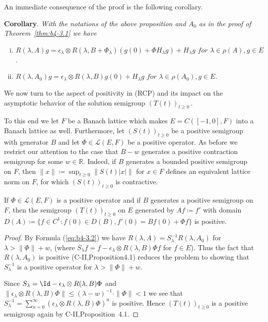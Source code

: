 An immediate consequence of the proof is the following corollary.

\medskip\noindent{}
\textbf{Corollary}. \textit{ With the notations of the above proposition and $A_{0}$ as in the proof of Theorem~\ref{thm:b4-3.1} we have}
\begin{enumerate}[(i),wide]
	\item  
	$R(\lambda,A)g = \epsilon_\lambda \otimes R(\lambda,B+\Phi_\lambda)(g(0)+\Phi H_\lambda g) + H_\lambda g \textit{ for } \lambda \in \rho(A), g \in E$.

	\item 
	$R(\lambda,A_{0})g = \epsilon_\lambda \otimes R(\lambda,B)g(0) + H_\lambda g \textit{ for }  \lambda \in \rho(A_{0}), g \in E$.
\end{enumerate}

We now turn to the aspect of positivity in (RCP) and its impact on the asymptotic behavior of the solution semigroup $(T(t))_{t \geq 0}$\,.

To this end we let $F$ be a Banach lattice which makes $E = C([-1,0],F)$ into a Banach lattice as well. Furthermore, let $(S(t))_{t \geq 0}$ be a positive semigroup with generator $B$ and let $\Phi \in \mathcal{L}(E,F)$ be a positive operator. As before we restrict our attention to the case that $B - w$ generates a positive contraction semigroup for some $w \in \mathbb{R}$. Indeed, if $B$ generates a bounded positive semigroup on $F$, then $\|x\|  \coloneq  \sup_{t \geq 0}\|S(t)|x|\|$ for $x \in F$ defines an equivalent lattice norm on $F$, for which $(S(t))_{t \geq 0}$ is contractive.
\begin{proposition}\label{prop:b4-3.5}
	If $\Phi \in \mathcal{L}(E,F)$ is a positive operator and if $B$ generates a positive semigroup on $F$, then the semigroup $(T(t))_{t \geq 0}$ on $E$ generated by $Af  \coloneq  f'$ with domain $D(A)  \coloneq  \{f \in C^1 \colon f(0) \in D(B), f'(0) = Bf(0) + \Phi f\}$ is positive.
\end{proposition}
%
%
\newpage
%
\begin{proof} By Formula (\ref{eq:b4-3.2}) we have $R(\lambda,A) = S_\lambda^{-1}R(\lambda,A_{0})$ for $\lambda > \|\Phi\|+w$, (where $S_\lambda f = f - \epsilon_\lambda \otimes R(\lambda,B)\Phi f$ for $f \in E$). Thus the fact that $R(\lambda,A_{0})$ is positive (C-II,Proposition4.1) reduces the problem to showing that $S_\lambda^{-1}$ is a positive operator for $\lambda > \|\Phi\|+w$.

Since $S_\lambda = \Id  - \epsilon_\lambda \otimes R(\lambda,B)\Phi$ and $\|\epsilon_\lambda \otimes R(\lambda,B)\Phi\| \leq (\lambda-w)^{-1} \cdot \|\Phi\| < 1$ we see that $S_\lambda^{-1} = \sum_{n=0}^{\infty}(\epsilon_\lambda \otimes R(\lambda,B)\Phi)^n$ is positive. Hence $(T(t))_{t \geq 0}$ is a positive semigroup again by C-II,Proposition~4.1.
\end{proof}

